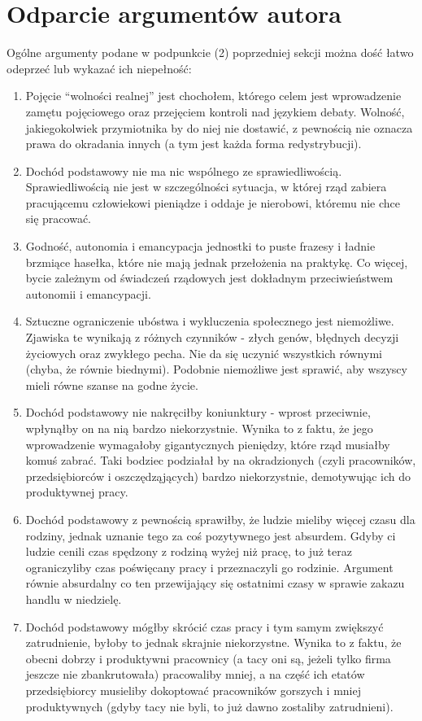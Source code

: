 \documentclass[11pt]{article}
\begin{document}
	\section{Odparcie argumentów autora}
		Ogólne argumenty podane w podpunkcie (2) poprzedniej sekcji można dość łatwo odeprzeć lub wykazać ich niepełność:
		\begin{enumerate}
			\item Pojęcie ``wolności realnej'' jest chochołem, którego celem jest wprowadzenie zamętu pojęciowego oraz przejęciem kontroli nad językiem debaty. Wolność, jakiegokolwiek przymiotnika by do niej nie dostawić, z pewnością nie oznacza prawa do okradania innych (a tym jest każda forma redystrybucji).
			\item Dochód podstawowy nie ma nic wspólnego ze sprawiedliwością. Sprawiedliwością nie jest w szczególności sytuacja, w której rząd zabiera pracującemu człowiekowi pieniądze i oddaje je nierobowi, któremu nie chce się pracować.
			\item Godność, autonomia i emancypacja jednostki to puste frazesy i ładnie brzmiące hasełka, które nie mają jednak przełożenia na praktykę. Co więcej, bycie zależnym od świadczeń rządowych jest dokładnym przeciwieństwem autonomii i emancypacji.
			\item Sztuczne ograniczenie ubóstwa i wykluczenia społecznego jest niemożliwe. Zjawiska te wynikają z różnych czynników - złych genów, błędnych decyzji życiowych oraz zwykłego pecha. Nie da się uczynić wszystkich równymi (chyba, że równie biednymi). Podobnie niemożliwe jest sprawić, aby wszyscy mieli równe szanse na godne życie.
			\item Dochód podstawowy nie nakręciłby koniunktury - wprost przeciwnie, wpłynąłby on na nią bardzo niekorzystnie. Wynika to z faktu, że jego wprowadzenie wymagałoby gigantycznych pieniędzy, które rząd musiałby komuś zabrać. Taki bodziec podziałał by na okradzionych (czyli pracowników, przedsiębiorców i oszczędząjących) bardzo niekorzystnie, demotywując ich do produktywnej pracy.
			\item Dochód podstawowy z pewnością sprawiłby, że ludzie mieliby więcej czasu dla rodziny, jednak uznanie tego za coś pozytywnego jest absurdem. Gdyby ci ludzie cenili czas spędzony z rodziną wyżej niż pracę, to już teraz ograniczyliby czas poświęcany pracy i przeznaczyli go rodzinie. Argument równie absurdalny co ten przewijający się ostatnimi czasy w sprawie zakazu handlu w niedzielę.
			\item Dochód podstawowy mógłby skrócić czas pracy i tym samym zwiększyć zatrudnienie, byłoby to jednak skrajnie niekorzystne. Wynika to z faktu, że obecni dobrzy i produktywni pracownicy (a tacy oni są, jeżeli tylko firma jeszcze nie zbankrutowała) pracowaliby mniej, a na część ich etatów przedsiębiorcy musieliby dokoptować pracowników gorszych i mniej produktywnych (gdyby tacy nie byli, to już dawno zostaliby zatrudnieni).

\end{enumerate}
\end{document}
